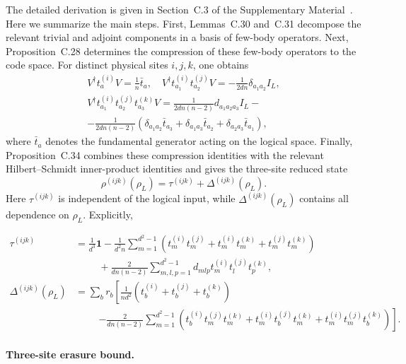 \documentclass[10pt,twocolumn,superscriptaddress,aps,amsmath,amssymb,citeautoscript,floatfix,prx,longbibliography]{revtex4-2}
\theoremstyle{plain}
\theoremstyle{plain}
\theoremstyle{plain}
\theoremstyle{plain}
\theoremstyle{plain}
\theoremstyle{plain}
\begin{document}
The detailed derivation is given in Section~C.3 of the Supplementary Material~\cite{SuppMat}. Here we summarize the main steps. First, Lemmas~C.30 and~C.31 decompose the relevant trivial and adjoint components in a basis of few-body operators. Next, Proposition~C.28 determines the compression of these few-body operators to the code space. For distinct physical sites $i,j,k$, one obtains
$$
\begin{gathered}
V^{\dagger} t_a^{(i)} V=\frac{1}{n} \bar{t}_a, \quad V^{\dagger} t_{a_1}^{(i)} t_{a_2}^{(j)} V=-\frac{1}{2 d n} \delta_{a_1 a_2} I_L, \\
V^{\dagger} t_{a_1}^{(i)} t_{a_2}^{(j)} t_{a_3}^{(k)} V=\frac{1}{2 d n(n-2)} d_{a_1 a_2 a_3} I_L-\\-\frac{1}{2 d n(n-2)}\left(\delta_{a_1 a_2} \bar{t}_{a_3}+\delta_{a_1 a_3} \bar{t}_{a_2}+\delta_{a_2 a_3} \bar{t}_{a_1}\right),
\end{gathered}
$$
where $\bar t_a$ denotes the fundamental generator acting on the logical space. Finally, Proposition~C.34 combines these compression identities with the relevant Hilbert--Schmidt inner-product identities and gives the three-site reduced state
\begin{equation}\label{eq:3q_reduced_state}
    \rho^{(ijk)}(\rho_L)
    =
    \tau^{(ijk)}
    +
    \Delta^{(ijk)}(\rho_L).
\end{equation}
Here $\tau^{(ijk)}$ is independent of the logical input, while $\Delta^{(ijk)}(\rho_L)$ contains all dependence on $\rho_L$. Explicitly,
\begin{widetext}
\begin{align}
\tau^{(ijk)}
&=
\frac{1}{d^3}\mathbf 1
-\frac{1}{d^2 n}
\sum_{m=1}^{d^2-1}
\left(
t_m^{(i)}t_m^{(j)}
+t_m^{(i)}t_m^{(k)}
+t_m^{(j)}t_m^{(k)}
\right)
\nonumber\\
&\hspace{1cm}
+\frac{2}{dn(n-2)}
\sum_{m,l,p=1}^{d^2-1}
d_{mlp}
t_m^{(i)}t_l^{(j)}t_p^{(k)},
\\
\Delta^{(ijk)}(\rho_L)
&=
\sum_b r_b
\left[
\frac{1}{nd^2}
\left(
t_b^{(i)}
+t_b^{(j)}
+t_b^{(k)}
\right)
\right.
\nonumber\\
&\hspace{1cm}
\left.
-\frac{2}{dn(n-2)}
\sum_{m=1}^{d^2-1}
\left(
t_b^{(i)}t_m^{(j)}t_m^{(k)}
+t_m^{(i)}t_b^{(j)}t_m^{(k)}
+t_m^{(i)}t_m^{(j)}t_b^{(k)}
\right)
\right].
\end{align}
\end{widetext}

\paragraph{Three-site erasure bound.}
\end{document}
